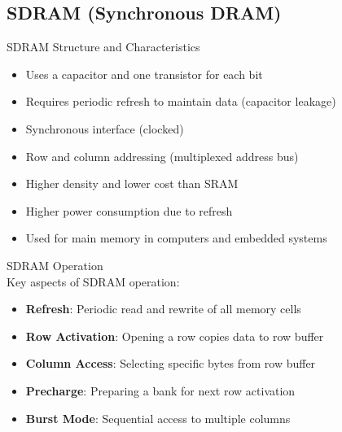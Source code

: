 \multend

\subsection{SDRAM (Synchronous DRAM)}


\begin{concept}{SDRAM Structure and Characteristics}
\begin{itemize}
    \item Uses a capacitor and one transistor for each bit
    \item Requires periodic refresh to maintain data (capacitor leakage)
    \item Synchronous interface (clocked)
    \item Row and column addressing (multiplexed address bus)
    \item Higher density and lower cost than SRAM
    \item Higher power consumption due to refresh
    \item Used for main memory in computers and embedded systems
\end{itemize}
\end{concept}

\begin{definition}{SDRAM Operation}\\
Key aspects of SDRAM operation:
\begin{itemize}
    \item \textbf{Refresh}: Periodic read and rewrite of all memory cells
    \item \textbf{Row Activation}: Opening a row copies data to row buffer
    \item \textbf{Column Access}: Selecting specific bytes from row buffer
    \item \textbf{Precharge}: Preparing a bank for next row activation
    \item \textbf{Burst Mode}: Sequential access to multiple columns
\end{itemize}
\end{definition}

\multend


